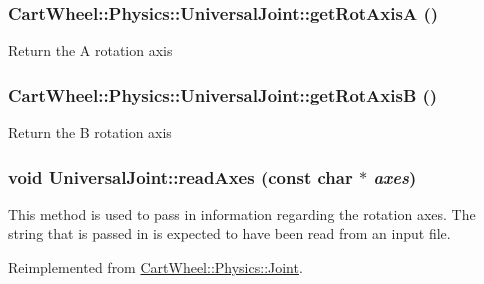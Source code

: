 \hypertarget{classCartWheel_1_1Physics_1_1UniversalJoint_ae0c9e3dfd1c9fcf90b580578a2160fe6}{
\subsubsection[{getRotAxisA}]{ CartWheel::Physics::UniversalJoint::getRotAxisA ()}}
\label{classCartWheel_1_1Physics_1_1UniversalJoint_ae0c9e3dfd1c9fcf90b580578a2160fe6}
Return the A rotation axis \hypertarget{classCartWheel_1_1Physics_1_1UniversalJoint_a867466f51e95e0b4c32fd35eb8e2b338}{
\subsubsection[{getRotAxisB}]{ CartWheel::Physics::UniversalJoint::getRotAxisB ()}}
\label{classCartWheel_1_1Physics_1_1UniversalJoint_a867466f51e95e0b4c32fd35eb8e2b338}
Return the B rotation axis \hypertarget{classCartWheel_1_1Physics_1_1UniversalJoint_ac2bbb40eff30cfce3979b0334ce8c88b}{
\subsubsection[{readAxes}]{\setlength{\rightskip}{0pt plus 5cm}void UniversalJoint::readAxes (const char $\ast$ {\em axes})}}
\label{classCartWheel_1_1Physics_1_1UniversalJoint_ac2bbb40eff30cfce3979b0334ce8c88b}
This method is used to pass in information regarding the rotation axes. The string that is passed in is expected to have been read from an input file. 

Reimplemented from \hyperlink{classCartWheel_1_1Physics_1_1Joint_a30ecfb4d75270a399661552df87c01de}{CartWheel::Physics::Joint}.

